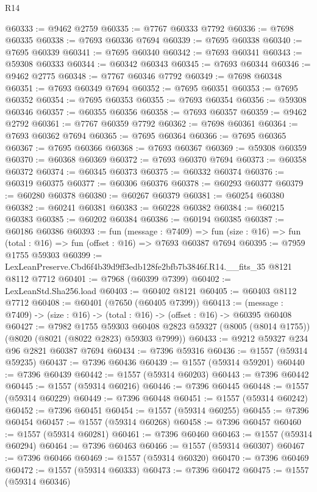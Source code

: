\begin{lexlean}{R14}
\begin{coremodule}
@60333 := @9462 @2759
@60335 := @7767 @60333 @7792
@60336 := @7698 @60335
@60338 := @7693 @60336 @7694
@60339 := @7695 @60338
@60340 := @7695 @60339
@60341 := @7695 @60340
@60342 := @7693 @60341
@60343 := @59308 @60333
@60344 := @60342 @60343
@60345 := @7693 @60344
@60346 := @9462 @2775
@60348 := @7767 @60346 @7792
@60349 := @7698 @60348
@60351 := @7693 @60349 @7694
@60352 := @7695 @60351
@60353 := @7695 @60352
@60354 := @7695 @60353
@60355 := @7693 @60354
@60356 := @59308 @60346
@60357 := @60355 @60356
@60358 := @7693 @60357
@60359 := @9462 @2792
@60361 := @7767 @60359 @7792
@60362 := @7698 @60361
@60364 := @7693 @60362 @7694
@60365 := @7695 @60364
@60366 := @7695 @60365
@60367 := @7695 @60366
@60368 := @7693 @60367
@60369 := @59308 @60359
@60370 := @60368 @60369
@60372 := @7693 @60370 @7694
@60373 := @60358 @60372
@60374 := @60345 @60373
@60375 := @60332 @60374
@60376 := @60319 @60375
@60377 := @60306 @60376
@60378 := @60293 @60377
@60379 := @60280 @60378
@60380 := @60267 @60379
@60381 := @60254 @60380
@60382 := @60241 @60381
@60383 := @60228 @60382
@60384 := @60215 @60383
@60385 := @60202 @60384
@60386 := @60194 @60385
@60387 := @60186 @60386
@60393 := fun (message : @7409) =>
  fun (size : @16) => fun (total : @16) => fun (offset : @16) => @7693 @60387 @7694
@60395 := @7959 @1755 @59303
@60399 := LexLeanPreserve.Cbd6f4b39d9ff3edb128fe2bfb7b3846f.R14.__fits_35 @8121 @8112 @7712
@60401 := @7968 (@60399 @7399)
@60402 := LexLeanStd.Sha256.load
@60403 := @60402 @8121
@60405 := @60403 @8112 @7712
@60408 := @60401 (@7650 (@60405 @7399))
@60413 := (message : @7409) -> (size : @16) -> (total : @16) -> (offset : @16) -> @60395 @60408
@60427 := @7982
    @1755
    @59303
    @60408
    @2823
    @59327
    (@8005 (@8014 @1755))
    (@8020 (@8021 (@8022 @2823) @59303 @7999))
@60433 := @9212 @59327 @234 @96 @2821 @60387 @7694
@60434 := @7396 @59316
@60436 := @1557 (@59314 @59235)
@60437 := @7396 @60436
@60439 := @1557 (@59314 @59201)
@60440 := @7396 @60439
@60442 := @1557 (@59314 @60203)
@60443 := @7396 @60442
@60445 := @1557 (@59314 @60216)
@60446 := @7396 @60445
@60448 := @1557 (@59314 @60229)
@60449 := @7396 @60448
@60451 := @1557 (@59314 @60242)
@60452 := @7396 @60451
@60454 := @1557 (@59314 @60255)
@60455 := @7396 @60454
@60457 := @1557 (@59314 @60268)
@60458 := @7396 @60457
@60460 := @1557 (@59314 @60281)
@60461 := @7396 @60460
@60463 := @1557 (@59314 @60294)
@60464 := @7396 @60463
@60466 := @1557 (@59314 @60307)
@60467 := @7396 @60466
@60469 := @1557 (@59314 @60320)
@60470 := @7396 @60469
@60472 := @1557 (@59314 @60333)
@60473 := @7396 @60472
@60475 := @1557 (@59314 @60346)

\end{coremodule}
\end{lexlean}
